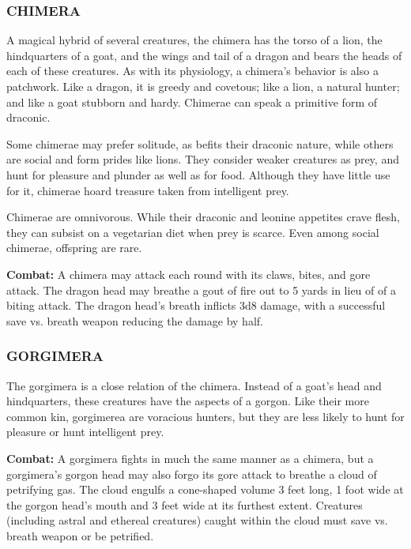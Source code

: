 \begin{multicols}{2}
\begin{minipage}{\columnwidth}
\end{minipage}

\subsubsection{CHIMERA}

A magical hybrid of several creatures, the chimera has the torso of a lion, the hindquarters of a goat, and the wings and tail of a dragon and bears the heads of each of these creatures. As with its physiology, a chimera's behavior is also a patchwork. Like a dragon, it is greedy and covetous; like a lion, a natural hunter; and like a goat stubborn and hardy. Chimerae can speak a primitive form of draconic.

Some chimerae may prefer solitude, as befits their draconic nature, while others are social and form prides like lions. They consider weaker creatures as prey, and hunt for pleasure and plunder as well as for food. Although they have little use for it, chimerae hoard treasure taken from intelligent prey.

Chimerae are omnivorous. While their draconic and leonine appetites crave flesh, they can subsist on a vegetarian diet when prey is scarce. Even among social chimerae, offspring are rare.

\textbf{Combat:} A chimera may attack each round with its claws, bites, and gore attack. The dragon head may breathe a gout of fire out to 5 yards in lieu of of a biting attack. The dragon head's breath inflicts 3d8 damage, with a successful save vs. breath weapon reducing the damage by half. 

\subsubsection{GORGIMERA}

The gorgimera is a close relation of the chimera. Instead of a goat's head and hindquarters, these creatures have the aspects of a gorgon. Like their more common kin, gorgimerea are voracious hunters, but they are less likely to hunt for pleasure or hunt intelligent prey.

\textbf{Combat:} A gorgimera fights in much the same manner as a chimera, but a gorgimera's gorgon head may also forgo its gore attack to breathe a cloud of petrifying gas. The cloud engulfs a cone-shaped volume 3 feet long, 1 foot wide at the gorgon head's mouth and 3 feet wide at its furthest extent. Creatures (including astral and ethereal creatures) caught within the cloud must save vs. breath weapon or be petrified.


\end{multicols}
